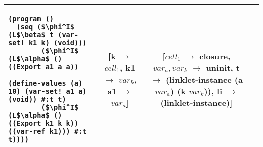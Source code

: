 \begin{adjustbox}{center}
\begin{tabular}{lc|c|c}
\begin{lstlisting}[mathescape]
(program ()
  (seq ($\phi^I$ (L$\beta$ t (var-set! k1 k) (void)))
        ($\phi^I$ (L$\alpha$ () ((Export a1 a a))
                (define-values (a) 10) (var-set! a1 a) (void)) #:t t)
        ($\phi^I$ (L$\alpha$ () ((Export k1 k k)) ((var-ref k1))) #:t t))))
    \end{lstlisting} & \thead{[k $\rightarrow$ $cell_1$,\\k1 $\rightarrow$ $var_k$,\\a1 $\rightarrow$ $var_a$]} & \thead{[$cell_1$ $\rightarrow$ closure,\\$var_a,var_k$ $\rightarrow$ uninit,\\t $\rightarrow$ (linklet-instance\\(a $var_a$) (k $var_k$)),\\li $\rightarrow$ (linklet-instance)]} \\ \hline
  \end{tabular}
\end{adjustbox}



